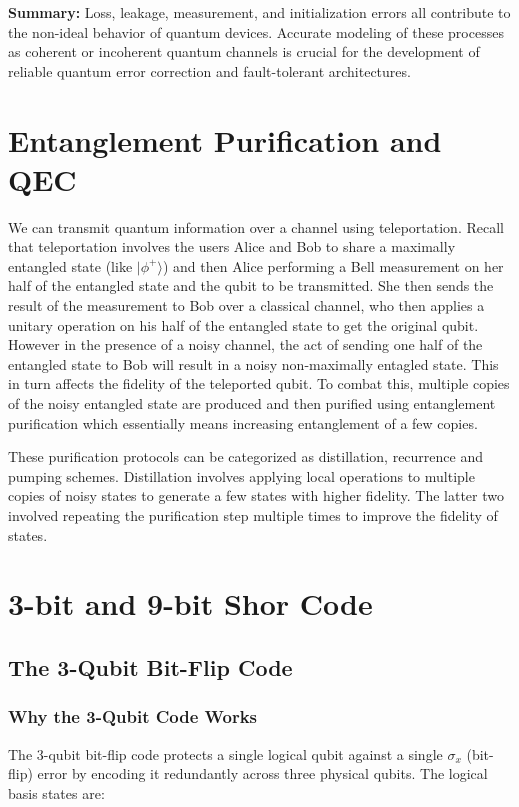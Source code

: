 \documentclass[conference]{IEEEtran}
\begin{document}
\textbf{Summary:} Loss, leakage, measurement, and initialization errors all contribute to the non-ideal behavior of quantum devices. Accurate modeling of these processes as coherent or incoherent quantum channels is crucial for the development of reliable quantum error correction and fault-tolerant architectures.


\section{Entanglement Purification and QEC}
We can transmit quantum information over a channel using teleportation. Recall that teleportation involves the users Alice and Bob to share a maximally entangled state (like $| \phi^+ \rangle$) and then Alice performing a Bell measurement on her half of the entangled state and the qubit to be transmitted. She then sends the result of the measurement to Bob over a classical channel, who then applies a unitary operation on his half of the entangled state to get the original qubit. However in the presence of a noisy channel, the act of sending one half of the entangled state to Bob will result in a noisy non-maximally entagled state. This in turn affects the fidelity of the teleported qubit. To combat this, multiple copies of the noisy entangled state are produced and then purified using entanglement purification which essentially means increasing entanglement of a few copies. \par

These purification protocols can be categorized as distillation, recurrence and pumping schemes. Distillation involves applying local operations to multiple copies of noisy states to generate a few states with higher fidelity. The latter two involved repeating the purification step multiple times to improve the fidelity of states.
\section{3-bit and 9-bit Shor Code}
\subsection{The 3-Qubit Bit-Flip Code}
\subsubsection{Why the 3-Qubit Code Works}

The 3-qubit bit-flip code protects a single logical qubit against a single $\sigma_x$ (bit-flip) error by encoding it redundantly across three physical qubits. The logical basis states are:
\end{document}
